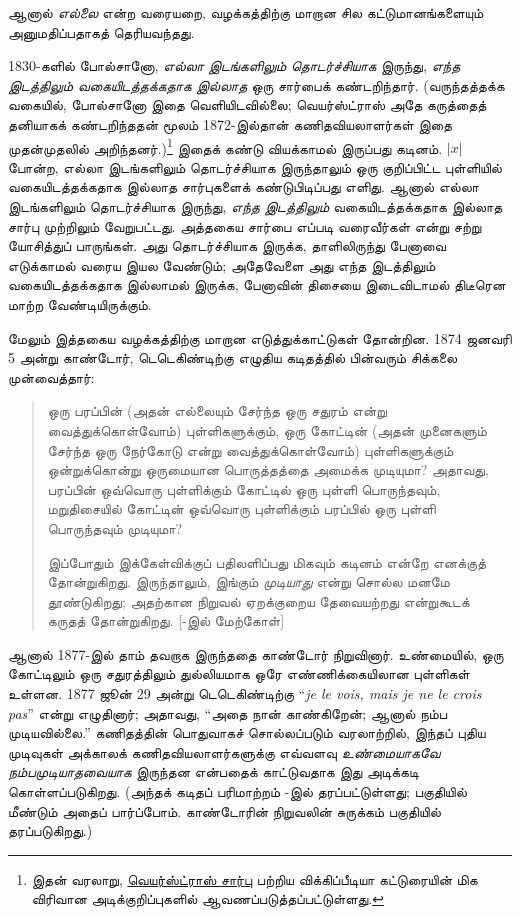 \documentclass[../../../include/open-logic-section]{subfiles}
\begin{document}

ஆனால் \emph{எல்லை} என்ற வரையறை, வழக்கத்திற்கு மாறான சில
கட்டுமானங்களையும் அனுமதிப்பதாகத் தெரியவந்தது.

1830-களில் போல்சானோ, \emph{எல்லா இடங்களிலும் தொடர்ச்சியாக} இருந்து,
\emph{எந்த இடத்திலும் வகையிடத்தக்கதாக இல்லாத} ஒரு சார்பைக் கண்டறிந்தார்.
(வருந்தத்தக்க வகையில், போல்சானோ இதை வெளியிடவில்லை; வெயர்ஸ்ட்ராஸ்
அதே கருத்தைத் தனியாகக் கண்டறிந்ததன் மூலம் 1872-இல்தான்
கணிதவியலாளர்கள் இதை முதன்முதலில் அறிந்தனர்.)\footnote{இதன் வரலாறு,
\href{http://en.wikipedia.org/wiki/Weierstrass_function}{வெயர்ஸ்ட்ராஸ்
சார்பு} பற்றிய விக்கிப்பீடியா கட்டுரையின் மிக விரிவான அடிக்குறிப்புகளில்
ஆவணப்படுத்தப்பட்டுள்ளது.} இதைக் கண்டு வியக்காமல் இருப்பது கடினம்.
$|x|$ போன்ற, எல்லா இடங்களிலும் தொடர்ச்சியாக இருந்தாலும் ஒரு
குறிப்பிட்ட புள்ளியில் வகையிடத்தக்கதாக இல்லாத சார்புகளைக் கண்டுபிடிப்பது
எளிது. ஆனால் எல்லா இடங்களிலும் தொடர்ச்சியாக இருந்து,
\emph{எந்த இடத்திலும்} வகையிடத்தக்கதாக இல்லாத சார்பு முற்றிலும்
வேறுபட்டது. அத்தகைய சார்பை எப்படி வரைவீர்கள் என்று சற்று
யோசித்துப் பாருங்கள். அது தொடர்ச்சியாக இருக்க, தாளிலிருந்து பேனாவை
எடுக்காமல் வரைய இயல வேண்டும்; அதேவேளை அது எந்த இடத்திலும்
வகையிடத்தக்கதாக இல்லாமல் இருக்க, பேனாவின் திசையை இடைவிடாமல்
திடீரென மாற்ற வேண்டியிருக்கும்.

மேலும் இத்தகைய வழக்கத்திற்கு மாறான எடுத்துக்காட்டுகள் தோன்றின.
1874 ஜனவரி 5 அன்று காண்டோர், டெடெகிண்டிற்கு எழுதிய கடிதத்தில்
பின்வரும் சிக்கலை முன்வைத்தார்:
\begin{quote}
ஒரு பரப்பின் (அதன் எல்லையும் சேர்ந்த ஒரு சதுரம் என்று வைத்துக்கொள்வோம்)
புள்ளிகளுக்கும், ஒரு கோட்டின் (அதன் முனைகளும் சேர்ந்த ஒரு நேர்கோடு
என்று வைத்துக்கொள்வோம்) புள்ளிகளுக்கும் ஒன்றுக்கொன்று ஒருமையான
பொருத்தத்தை அமைக்க முடியுமா? அதாவது, பரப்பின் ஒவ்வொரு புள்ளிக்கும்
கோட்டில் ஒரு புள்ளி பொருந்தவும், மறுதிசையில் கோட்டின் ஒவ்வொரு
புள்ளிக்கும் பரப்பில் ஒரு புள்ளி பொருந்தவும் முடியுமா?

இப்போதும் இக்கேள்விக்குப் பதிலளிப்பது மிகவும் கடினம் என்றே எனக்குத்
தோன்றுகிறது. இருந்தாலும், இங்கும் \emph{முடியாது} என்று சொல்ல
மனமே தூண்டுகிறது; அதற்கான நிறுவல் ஏறக்குறைய தேவையற்றது என்றுகூடக்
கருதத் தோன்றுகிறது. [\citealt{Gouvea2011}-இல் மேற்கோள்]
\end{quote}
ஆனால் 1877-இல் தாம் தவறாக இருந்ததை காண்டோர் நிறுவினார்.
உண்மையில், ஒரு கோட்டிலும் ஒரு சதுரத்திலும் துல்லியமாக ஒரே எண்ணிக்கையிலான
புள்ளிகள் உள்ளன. 1877 ஜூன் 29 அன்று டெடெகிண்டிற்கு
“\emph{je le vois, mais je ne le crois pas}” என்று எழுதினார்;
அதாவது, “அதை நான் காண்கிறேன்; ஆனால் நம்ப முடியவில்லை.”
கணிதத்தின் பொதுவாகச் சொல்லப்படும் வரலாற்றில், இந்தப் புதிய முடிவுகள்
அக்காலக் கணிதவியலாளர்களுக்கு எவ்வளவு \emph{உண்மையாகவே நம்பமுடியாதவையாக}
இருந்தன என்பதைக் காட்டுவதாக இது அடிக்கடி கொள்ளப்படுகிறது.
(அந்தக் கடிதப் பரிமாற்றம் \citet{Gouvea2011}-இல் தரப்பட்டுள்ளது;
 பகுதியில் மீண்டும் அதைப் பார்ப்போம்.
காண்டோரின் நிறுவலின் சுருக்கம் 
பகுதியில் தரப்படுகிறது.)
\end{document}
